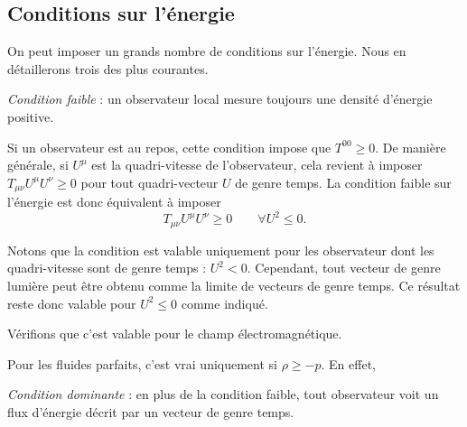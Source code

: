 \documentclass[a4paper,11pt]{report}
\begin{document}
        \subsection{Conditions sur l'énergie}
        
            On peut imposer un grands nombre de conditions sur l'énergie. Nous en détaillerons trois des plus courantes.
            
            \begin{definition}
                \textit{Condition faible} : un observateur local mesure toujours une densité d'énergie positive.
            \end{definition}
            
            Si un observateur est au repos, cette condition impose que $T^{00}\geq 0$. De manière générale, si $U^\mu$ est la quadri-vitesse de l'observateur, cela revient à imposer $T_{\mu\nu}U^\mu U^\nu \geq 0$ pour tout quadri-vecteur $U$ de genre temps. La condition faible sur l'énergie est donc équivalent à imposer 
            \begin{equation}
                T_{\mu\nu}U^\mu U^\nu \geq 0\qquad \forall U^2\leq 0.
            \end{equation}
            
            \begin{rmk}
                Notons que la condition est valable uniquement pour les observateur dont les quadri-vitesse sont de genre temps : $U^2<0$. Cependant, tout vecteur de genre lumière peut être obtenu comme la limite de vecteurs de genre temps. Ce résultat reste donc valable pour $U^2\leq0$ comme indiqué.
            \end{rmk}
            
            \begin{exmp}
                Vérifions que c'est valable pour le champ électromagnétique.
                \comp
            \end{exmp}
            
            \begin{exmp}
                Pour les fluides parfaits, c'est vrai uniquement si $\rho\geq -p$. En effet,
                \comp
            \end{exmp}
            
            \begin{definition}
                \textit{Condition dominante} : en plus de la condition faible, tout observateur voit un flux d'énergie décrit par un vecteur de genre temps.
            \end{definition}
            
\end{document}
